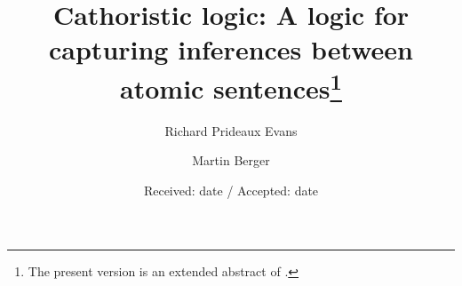 \documentclass{llncs}
\begin{document}
\title {Cathoristic logic: A logic for capturing inferences between atomic sentences\thanks{The present version is an extended abstract of \cite{Evans:catlogLONG}.}}
\author{Richard Prideaux Evans \and  Martin Berger}
\date{Received: date / Accepted: date}


 
\maketitle







% 

 


\end{document}
